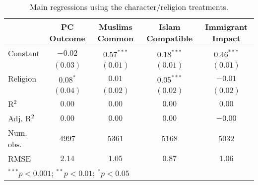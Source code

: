 
\begin{table}[H]
\begin{center}
\begin{footnotesize}
\begin{tabular}{l c c c c}
\hline
 & PC Outcome & Muslims Common & Islam Compatible & Immigrant Impact \\
\hline
Constant   & $-0.02$    & $0.57^{***}$ & $0.18^{***}$ & $0.46^{***}$ \\
           & $(0.03)$   & $(0.01)$     & $(0.01)$     & $(0.01)$     \\
Religion   & $0.08^{*}$ & $0.01$       & $0.05^{***}$ & $-0.01$      \\
           & $(0.04)$   & $(0.02)$     & $(0.02)$     & $(0.02)$     \\
\hline
R$^2$      & $0.00$     & $0.00$       & $0.00$       & $0.00$       \\
Adj. R$^2$ & $0.00$     & $0.00$       & $0.00$       & $-0.00$      \\
Num. obs.  & $4997$     & $5361$       & $5168$       & $5032$       \\
RMSE       & $2.14$     & $1.05$       & $0.87$       & $1.06$       \\
\hline
\multicolumn{5}{l}{\tiny{$^{***}p<0.001$; $^{**}p<0.01$; $^{*}p<0.05$}}
\end{tabular}
\end{footnotesize}
\caption{Main regressions using the character/religion treatments.}
\label{tab:fb_reg_final}
\end{center}
\end{table}
